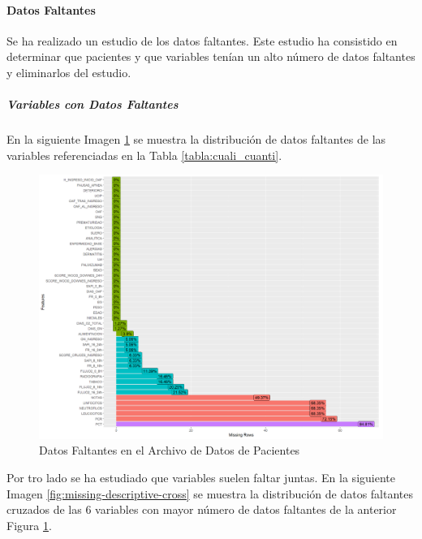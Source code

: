 \paragraph*{Datos Faltantes}

Se ha realizado un estudio de los datos faltantes. Este estudio ha consistido en determinar que pacientes y que variables tenían un alto número de datos faltantes y eliminarlos del estudio. 

\subparagraph*{Variables con Datos Faltantes} 

En la siguiente Imagen \ref{fig:missing-descriptive} se muestra la distribución de datos faltantes de las variables referenciadas en la Tabla \ref{tabla:cuali_cuanti}. 
 
\begin{figure}[H]
    \centering
    \includegraphics[scale = 0.70]{./img/missig-data-descriptive.png}
    \caption{Datos Faltantes en el Archivo de Datos de Pacientes}
    \label{fig:missing-descriptive}
\end{figure}

Por tro lado se ha estudiado que variables suelen faltar juntas. En la siguiente Imagen \ref{fig:missing-descriptive-cross} se muestra la distribución de datos faltantes cruzados de las 6 variables con mayor número de datos faltantes de la anterior Figura \ref{fig:missing-descriptive}.

